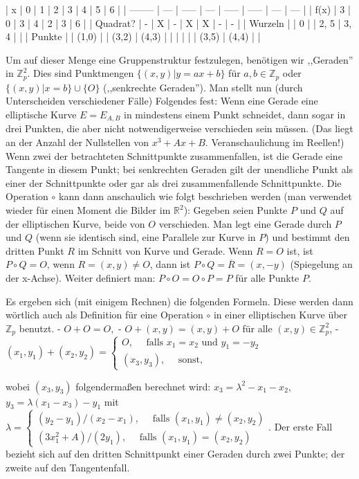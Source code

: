 \documentclass[a4paper]{article}
\begin{document}
\begin{multicols}{3}
    | x        | 0   | 1     | 2   | 3     | 4     | 5   | 6   |
    | -------- | --- | ----- | --- | ----- | ----- | --- | --- |
    | f(x)     | 3   | 0     | 3   | 4     | 2     | 3   | 6   |
    | Quadrat? | -   | X     | -   | X     | X     | -   | -   |
    | Wurzeln  |     | 0     |     | 2, 5  | 3, 4  |     |
    | Punkte   |     | (1,0) |     | (3,2) | (4,3) |
    |          |     |       |     | (3,5) | (4,4) |     |

    Um auf dieser Menge eine Gruppenstruktur festzulegen, benötigen wir ,,Geraden'' in $\mathbb{Z}^2_p$. Dies sind Punktmengen $\{(x,y)|y=ax+b\}$ für $a,b\in\mathbb{Z}_p$ oder $\{(x,y)|x=b\}\cup\{O\}$ (,,senkrechte Geraden''). Man stellt nun (durch Unterscheiden verschiedener Fälle) Folgendes fest: Wenn eine Gerade eine elliptische Kurve $E=E_{A,B}$ in mindestens einem Punkt schneidet, dann sogar in drei Punkten, die aber nicht notwendigerweise verschieden sein müssen. (Das liegt an der Anzahl der Nullstellen von $x^3+Ax+B$. Veranschaulichung im Reellen!)
    Wenn zwei der betrachteten Schnittpunkte zusammenfallen, ist die Gerade eine Tangente in diesem Punkt; bei senkrechten Geraden gilt der unendliche Punkt als einer der Schnittpunkte oder gar als drei zusammenfallende Schnittpunkte.
    Die Operation $\circ$ kann dann anschaulich wie folgt beschrieben werden (man verwendet wieder für einen Moment die Bilder im $\mathbb{R}^2$): Gegeben seien Punkte $P$ und $Q$ auf der elliptischen Kurve, beide von $O$ verschieden. Man legt eine Gerade durch $P$ und $Q$ (wenn sie identisch sind, eine Parallele zur Kurve in $P$) und bestimmt den dritten Punkt $R$ im Schnitt von Kurve und Gerade. Wenn $R=O$ ist, ist $P\circ Q=O$, wenn $R= (x,y)\not=O$, dann ist $P\circ Q=\overline{R}= (x,-y)$ (Spiegelung an der x-Achse).
    Weiter definiert man: $P\circ O=O\circ P=P$ für alle Punkte $P$.

    Es ergeben sich (mit einigem Rechnen) die folgenden Formeln. Diese werden dann wörtlich auch als Definition für eine Operation $\circ$ in einer elliptischen Kurve über $\mathbb{Z}_p$ benutzt.
    - $O+O=O,$
    - $O+ (x,y) = (x,y) +O$ für alle $(x,y)\in\mathbb{Z}^2_p$,
    - $(x_1,y_1) + (x_2,y_2) =\begin{cases} O,\quad\text{ falls } x_1=x_2 \text{ und } y_1=-y_2 \\ (x_3,y_3),\quad\text{ sonst,}\end{cases}$

    wobei $(x_3,y_3)$ folgendermaßen berechnet wird: $x_3=\lambda^2-x_1-x_2$, $y_3=\lambda(x_1-x_3)-y_1$ mit $\lambda=\begin{cases} (y_2-y_1)/(x_2-x_1),\quad\text{ falls } (x_1,y_1)\not= (x_2,y_2)\\ (3x^2_1+A)/(2y_1),\quad\text{ falls } (x_1,y_1) = (x_2,y_2)\end{cases}$.
    Der erste Fall bezieht sich auf den dritten Schnittpunkt einer Geraden durch zwei Punkte; der zweite auf den Tangentenfall.


\end{multicols}
\end{document}
